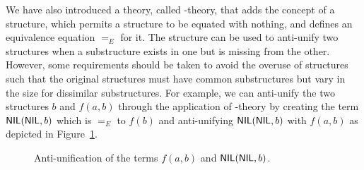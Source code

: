We have also introduced a theory, called \NIL{}-theory, that adds the concept of a \NIL{} structure, which permits a structure to be equated with nothing, and defines an equivalence equation $=_E$ for it. The \NIL{} structure can be used to anti-unify two structures when a substructure exists in one but is missing from the other. However, some requirements should be taken to avoid the overuse of \NIL{} structures such that the original structures must have common substructures but vary in the size for dissimilar substructures. For example, we can anti-unify the two structures $b$ and $f(a,b)$ through the application of \NIL{}-theory by creating the term $\textsf{NIL}(\textsf{NIL},b)$ which is $=_E$ to $f(b)$ and anti-unifying $\textsf{NIL}(\textsf{NIL},b)$ with $f(a,b)$ as depicted in Figure~\ref{fig:anti-nil}.
\begin{figure}[t]
\centering{}
\caption{Anti-unification of the terms $f(a, b)$ and $\textsf{NIL}(\textsf{NIL},b)$.\label{fig:anti-nil}}
\end{figure}



